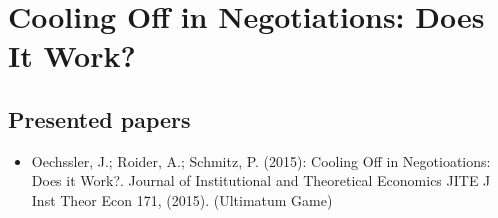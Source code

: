 

\chapter{Cooling Off in Negotiations: Does It Work?}

\section{Presented papers}

\begin{itemize}
	\item Oechssler, J.; Roider, A.; Schmitz, P. (2015): Cooling Off in Negotioations: Does it Work?. Journal of Institutional and Theoretical Economics JITE J Inst Theor Econ 171, (2015). (Ultimatum Game)
\end{itemize}



\newpage